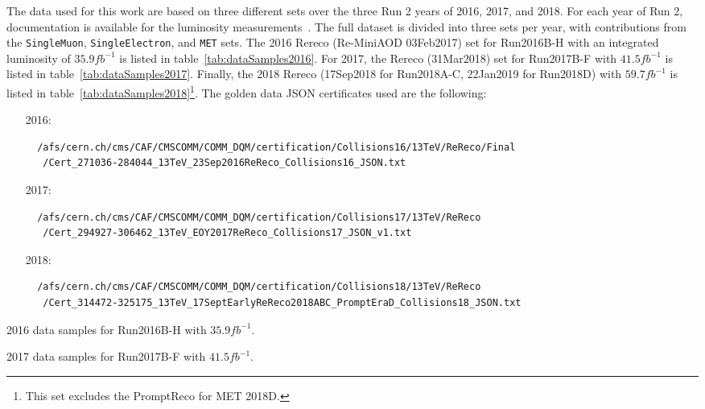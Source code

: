 The data used for this work are based on three different sets over the three Run 2 years of 2016, 2017, and 2018.
For each year of Run 2, documentation is available for the luminosity measurements~\cite{CMS-PAS-LUM-17-001,CMS-PAS-LUM-17-004,CMS-PAS-LUM-18-002}.
The full dataset is divided into three sets per year, with contributions from the \texttt{SingleMuon}, \texttt{SingleElectron}, and \texttt{MET} sets.
The 2016 Rereco (Re-MiniAOD 03Feb2017) set for Run2016B-H with an integrated luminosity of $35.9\unit{fb^{-1}}$ is listed in table~\ref{tab:dataSamples2016}.
For 2017, the Rereco (31Mar2018) set for Run2017B-F with $41.5\unit{fb^{-1}}$ is listed in table~\ref{tab:dataSamples2017}.
Finally, the 2018 Rereco (17Sep2018 for Run2018A-C, 22Jan2019 for Run2018D) with $59.7\unit{fb^{-1}}$ is listed in table~\ref{tab:dataSamples2018}\footnote{This set excludes the PromptReco for MET 2018D.}.
The golden data JSON certificates used are the following:
\begin{itemize}
  \item[2016:]
  \begingroup
  \fontsize{9pt}{12pt}
  \begin{verbatim}
  /afs/cern.ch/cms/CAF/CMSCOMM/COMM_DQM/certification/Collisions16/13TeV/ReReco/Final
   /Cert_271036-284044_13TeV_23Sep2016ReReco_Collisions16_JSON.txt
  \end{verbatim}
  \endgroup
  \item[2017:]
  \begingroup
  \fontsize{9pt}{12pt}
  \begin{verbatim}
  /afs/cern.ch/cms/CAF/CMSCOMM/COMM_DQM/certification/Collisions17/13TeV/ReReco
   /Cert_294927-306462_13TeV_EOY2017ReReco_Collisions17_JSON_v1.txt
  \end{verbatim}
  \endgroup
  \item[2018:]
  \begingroup
  \fontsize{9pt}{12pt}
  \begin{verbatim}
  /afs/cern.ch/cms/CAF/CMSCOMM/COMM_DQM/certification/Collisions18/13TeV/ReReco
   /Cert_314472-325175_13TeV_17SeptEarlyReReco2018ABC_PromptEraD_Collisions18_JSON.txt
  \end{verbatim}
  \endgroup
\end{itemize}

\begin{table}[htbp]
  \centering
  
  \caption{
    2016 data samples for Run2016B-H with $35.9\unit{fb^{-1}}$.
  }
  \label{tab:dataSamples2016}
\end{table}
\begin{table}[htbp]
  \centering
  
  \caption{
    2017 data samples for Run2017B-F with $41.5\unit{fb^{-1}}$.
  }
  \label{tab:dataSamples2017}
\end{table}

